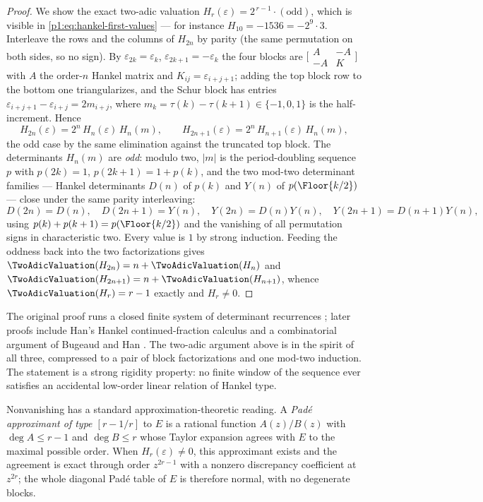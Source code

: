 \documentclass[11pt,oneside]{article}
\numberwithin{equation}{section}
\theoremstyle{definition}
\theoremstyle{remark}
\newcommand{\eps}{\varepsilon}
\begin{document}
\begin{proof}
We show the exact two-adic valuation
\(H_r(\eps)=2^{\,r-1}\cdot(\text{odd})\), which is visible in
\eqref{p1:eq:hankel-first-values} --- for instance
\(H_{10}=-1536=-2^9\cdot3\).  Interleave the rows and the columns of
\(H_{2n}\) by parity (the same permutation on both sides, so no sign).
By \(\eps_{2k}=\eps_k\), \(\eps_{2k+1}=-\eps_k\) the four blocks
are \(\bigl[\begin{smallmatrix}A&-A\\-A&K\end{smallmatrix}\bigr]\)
with \(A\) the order-\(n\) Hankel matrix and
\(K_{ij}=\eps_{i+j+1}\); adding the top block row to the bottom one
triangularizes, and the Schur block has entries
\(\eps_{i+j+1}-\eps_{i+j}=2m_{i+j}\), where
\(m_k=\tau(k)-\tau(k+1)\in\{-1,0,1\}\) is the half-increment.
Hence
\[
  H_{2n}(\eps)=2^n\,H_n(\eps)\,H_n(m),
  \qquad
  H_{2n+1}(\eps)=2^n\,H_{n+1}(\eps)\,H_n(m),
\]
the odd case by the same elimination against the truncated top block.
The determinants \(H_n(m)\) are \emph{odd}: modulo two, \(|m|\) is
the period-doubling sequence \(p\) with \(p(2k)=1\),
\(p(2k+1)=1+p(k)\), and the two mod-two determinant families ---
Hankel determinants \(D(n)\) of \(p(k)\) and \(Y(n)\) of
\(p(\Floor{k/2})\) --- close under the same parity
interleaving:
\[
  D(2n)=D(n),\quad D(2n+1)=Y(n),\quad
  Y(2n)=D(n)Y(n),\quad Y(2n+1)=D(n+1)Y(n),
\]
using \(p(k)+p(k+1)=p(\Floor{k/2})\) and the vanishing of
all permutation signs in characteristic two.  Every value is \(1\) by
strong induction.  Feeding the oddness back into the two
factorizations gives
\(\TwoAdicValuation(H_{2n})=n+\TwoAdicValuation(H_n)\) and
\(\TwoAdicValuation(H_{2n+1})=n+\TwoAdicValuation(H_{n+1})\), whence
\(\TwoAdicValuation(H_r)=r-1\) exactly
and \(H_r\ne0\).
\end{proof}

The original proof runs a closed finite system of determinant recurrences
\cite{p1:apww1998}; later proofs include Han's Hankel continued-fraction
calculus \cite{p1:han2014} and a combinatorial argument of Bugeaud and Han
\cite{p1:bugeaudHan2014}.  The two-adic argument above is in the spirit of
all three, compressed to a pair of block factorizations and one mod-two
induction.  The statement is a strong rigidity property: no
finite window of the sequence ever satisfies an accidental low-order linear
relation of Hankel type.

Nonvanishing has a standard approximation-theoretic reading.  A \emph{Pad\'e
approximant of type \([r-1/r]\)} to \(E\) is a rational function
\(A(z)/B(z)\) with \(\deg A\le r-1\) and \(\deg B\le r\) whose Taylor
expansion agrees with \(E\) to the maximal possible order.  When
\(H_r(\eps)\ne0\), this approximant exists and the agreement is exact
through order \(z^{2r-1}\) with a nonzero discrepancy coefficient at
\(z^{2r}\); the whole diagonal Pad\'e table of \(E\) is therefore normal,
with no degenerate blocks.
\end{document}
